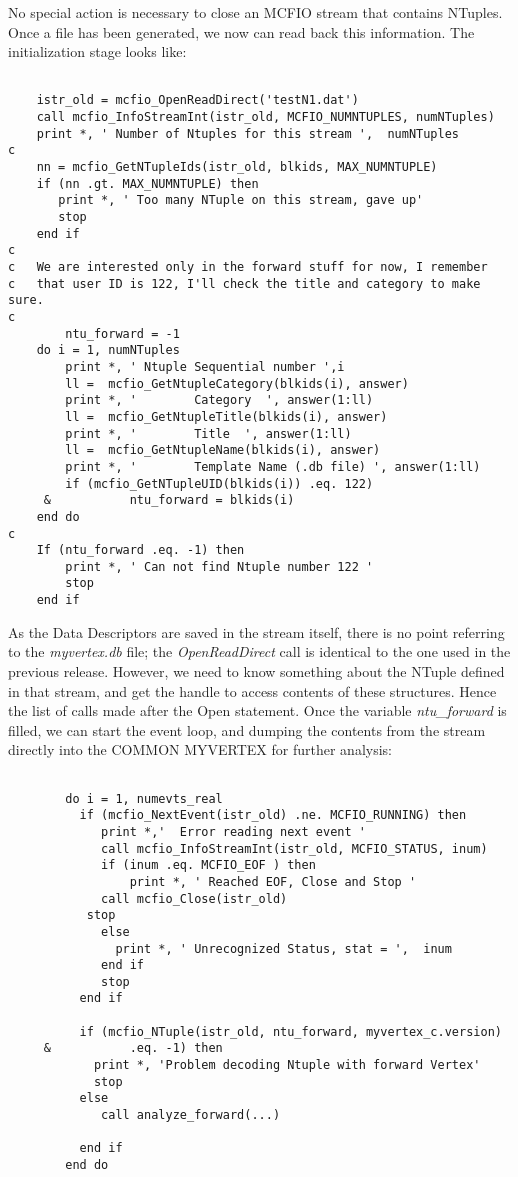 	No special action is necessary to close an MCFIO stream that 
contains NTuples.  Once a file has been generated, we now can read back this 
information.  The initialization stage looks like:

\begin{verbatim}

	istr_old = mcfio_OpenReadDirect('testN1.dat')
	call mcfio_InfoStreamInt(istr_old, MCFIO_NUMNTUPLES, numNTuples)
	print *, ' Number of Ntuples for this stream ',  numNTuples
c
	nn = mcfio_GetNTupleIds(istr_old, blkids, MAX_NUMNTUPLE)
	if (nn .gt. MAX_NUMNTUPLE) then 
	   print *, ' Too many NTuple on this stream, gave up'
	   stop
	end if
c
c	We are interested only in the forward stuff for now, I remember 
c	that user ID is 122, I'll check the title and category to make sure.
c
        ntu_forward = -1
	do i = 1, numNTuples
	    print *, ' Ntuple Sequential number ',i 
	    ll =  mcfio_GetNtupleCategory(blkids(i), answer)
	    print *, '        Category  ', answer(1:ll)
	    ll =  mcfio_GetNtupleTitle(blkids(i), answer)
	    print *, '        Title  ', answer(1:ll)
	    ll =  mcfio_GetNtupleName(blkids(i), answer)
	    print *, '        Template Name (.db file) ', answer(1:ll)
	    if (mcfio_GetNTupleUID(blkids(i)) .eq. 122)
     &           ntu_forward = blkids(i)
	end do
c
	If (ntu_forward .eq. -1) then 
	    print *, ' Can not find Ntuple number 122 '
	    stop
	end if 	     		

\end{verbatim}

  	 As the Data Descriptors are saved in the stream itself, there 
is no point referring to the {\em myvertex.db} file; the {\em OpenReadDirect} 
call is identical to the one used in the previous release.  However, we need
to know something about the NTuple defined in that stream, and get the handle
to access contents of these structures.  Hence the list of calls made after 
the Open statement. Once the variable {\em ntu\_forward} is filled, we can 
start the event loop, and dumping the contents from the stream directly into 
the COMMON MYVERTEX for further analysis:

\begin{verbatim}
    	 
        do i = 1, numevts_real
          if (mcfio_NextEvent(istr_old) .ne. MCFIO_RUNNING) then 
             print *,'  Error reading next event '
             call mcfio_InfoStreamInt(istr_old, MCFIO_STATUS, inum)
             if (inum .eq. MCFIO_EOF ) then
                 print *, ' Reached EOF, Close and Stop '
	         call mcfio_Close(istr_old)
	       stop
             else 
               print *, ' Unrecognized Status, stat = ',  inum
             end if 
             stop
          end if
           
          if (mcfio_NTuple(istr_old, ntu_forward, myvertex_c.version)
     &           .eq. -1) then 
            print *, 'Problem decoding Ntuple with forward Vertex'
            stop
          else 
             call analyze_forward(...)  
          
          end if
        end do
        
\end{verbatim}

